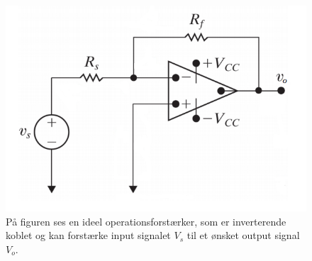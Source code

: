 \begin{figure}[H]
\centering
\includegraphics[scale=0.6]{figures/bProblemanalyse/inverterendeforstaerker.png}
\caption{På figuren ses en ideel operationsforstærker, som er inverterende koblet og kan forstærke input signalet $V_{s}$ til et ønsket output signal $V_{o}$. \cite{Nilsson2011}}
\label{invf}
\end{figure}



